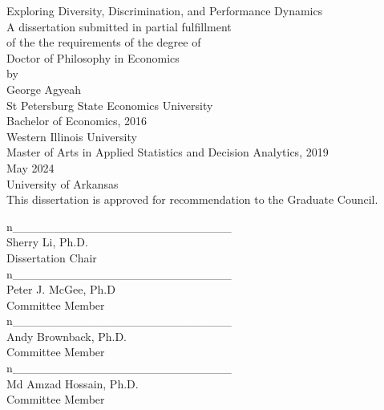\thispagestyle{empty} %

\singlespacing

\begin{center}
\centering
Exploring Diversity, Discrimination, and Performance Dynamics \\
A dissertation submitted in partial fulfillment \\
of the the requirements of the degree of \\
Doctor of Philosophy in Economics \\
by \\
George Agyeah \\
St Petersburg State Economics University \\
Bachelor of Economics, 2016 \\
Western Illinois University \\
Master of Arts in Applied Statistics and Decision Analytics, 2019 \\
May 2024 \\
University of Arkansas \\
This dissertation is approved for recommendation to the Graduate Council. \\

\vspace{1.5cm} %

\singlespacing
\raggedright %
{\fontsize{12}{1} {n}\selectfont\color{color_29791}\_\_\_\_\_\_\_\_\_\_\_\_\_\_\_\_\_\_\_\_\_\_\_\_\_\_}\\
Sherry Li, Ph.D. \\
Dissertation Chair \\
\vspace{1cm} %
{\fontsize{12}{1} {n}\selectfont\color{color_29791}\_\_\_\_\_\_\_\_\_\_\_\_\_\_\_\_\_\_\_\_\_\_\_\_\_\_}\\
Peter J. McGee, Ph.D \\
Committee Member \\
\vspace{1cm} %
{\fontsize{12}{1} {n}\selectfont\color{color_29791}\_\_\_\_\_\_\_\_\_\_\_\_\_\_\_\_\_\_\_\_\_\_\_\_\_\_}\\
Andy Brownback, Ph.D. \\
Committee Member \\
\vspace{1cm} %
{\fontsize{12}{1} {n}\selectfont\color{color_29791}\_\_\_\_\_\_\_\_\_\_\_\_\_\_\_\_\_\_\_\_\_\_\_\_\_\_}\\
Md Amzad Hossain, Ph.D. \\
Committee Member \\

\end{center}